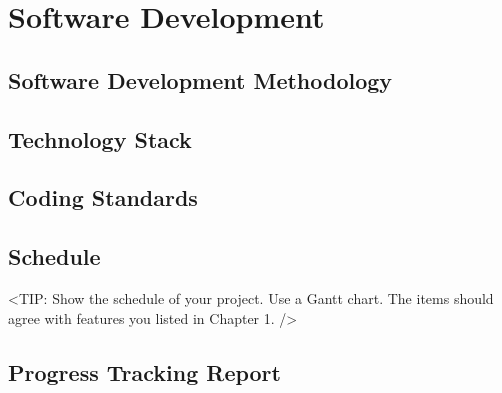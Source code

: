 \chapter{Software Development}
\label{chap:software-development}

\section{Software Development Methodology}
\label{section:software-development-methodology}

\section{Technology Stack}
\label{section:technology-stack}

\section{Coding Standards}
\label{section:coding-standards}

\newpage
\section{Schedule}
\label{section:schedule}
<TIP: Show the schedule of your project.
Use a Gantt chart. The items should agree with features
you listed in Chapter 1. />

\section{Progress Tracking Report}
\label{section:progress-tracking-report}

